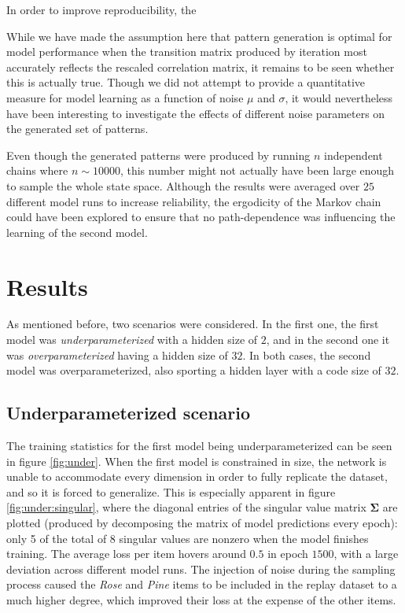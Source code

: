 \documentclass[11pt]{article}
\theoremstyle{remark}
\begin{document}
In order to improve reproducibility, the

While we have made the assumption here that pattern generation is optimal for model performance when the transition matrix produced by iteration most accurately reflects the rescaled correlation matrix, it remains to be seen whether this is actually true. Though we did not attempt to provide a quantitative measure for model learning as a function of noise $\mu$ and $\sigma$, it would nevertheless have been interesting to investigate the effects of different noise parameters on the generated set of patterns.

Even though the generated patterns were produced by running $n$ independent chains where $n \sim 10000$, this number might not actually have been large enough to sample the whole state space. Although the results were averaged over $25$ different model runs to increase reliability, the ergodicity of the Markov chain could have been explored to ensure that no path-dependence was influencing the learning of the second model.

\section{Results}

As mentioned before, two scenarios were considered. In the first one, the first model was \textit{underparameterized} with a hidden size of $2$, and in the second one it was \textit{overparameterized} having a hidden size of $32$. In both cases, the second model was overparameterized, also sporting a hidden layer with a code size of $32$.

\subsection{Underparameterized scenario}

The training statistics for the first model being underparameterized can be seen in figure \ref{fig:under}. When the first model is constrained in size, the network is unable to accommodate every dimension in order to fully replicate the dataset, and so it is forced to generalize. This is especially apparent in figure \ref{fig:under:singular}, where the diagonal entries of the singular value matrix $\bm{\Sigma}$ are plotted (produced by decomposing the matrix of model predictions every epoch): only 5 of the total of 8 singular values are nonzero when the model finishes training. The average loss per item hovers around $0.5$ in epoch $1500$, with a large deviation across different model runs. The injection of noise during the sampling process caused the \textit{Rose} and \textit{Pine} items to be included in the replay dataset to a much higher degree, which improved their loss at the expense of the other items.
\end{document}
